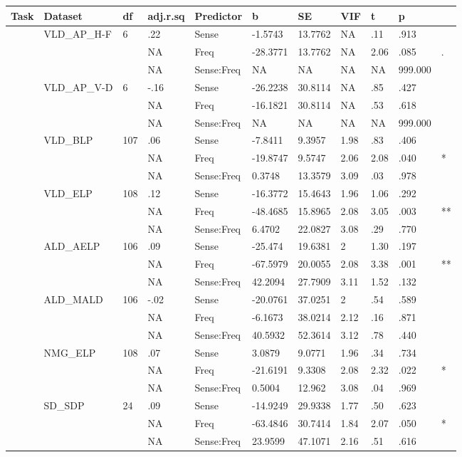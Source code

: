 \begin{table}[ht]
\centering
\begingroup\normalsize
\begin{tabular}{lllllllllll}
  \hline
Task & Dataset & df & adj.r.sq & Predictor & b & SE & VIF & t & p &  \\ 
  \hline
 & VLD\_AP\_H-F & 6 & .22 & Sense & -1.5743 & 13.7762 & NA & .11 & .913 &   \\ 
   &  &  & NA & Freq & -28.3771 & 13.7762 & NA & 2.06 & .085 & . \\ 
   &  &  & NA & Sense:Freq & NA & NA & NA & NA & 999.000 &  \\ 
   & VLD\_AP\_V-D & 6 & -.16 & Sense & -26.2238 & 30.8114 & NA & .85 & .427 &   \\ 
   &  &  & NA & Freq & -16.1821 & 30.8114 & NA & .53 & .618 &   \\ 
   &  &  & NA & Sense:Freq & NA & NA & NA & NA & 999.000 &  \\ 
   & VLD\_BLP & 107 & .06 & Sense & -7.8411 & 9.3957 & 1.98 & .83 & .406 &   \\ 
   &  &  & NA & Freq & -19.8747 & 9.5747 & 2.06 & 2.08 & .040 & * \\ 
   &  &  & NA & Sense:Freq & 0.3748 & 13.3579 & 3.09 & .03 & .978 &   \\ 
   & VLD\_ELP & 108 & .12 & Sense & -16.3772 & 15.4643 & 1.96 & 1.06 & .292 &   \\ 
   &  &  & NA & Freq & -48.4685 & 15.8965 & 2.08 & 3.05 & .003 & ** \\ 
   &  &  & NA & Sense:Freq & 6.4702 & 22.0827 & 3.08 & .29 & .770 &   \\ 
   & ALD\_AELP & 106 & .09 & Sense & -25.474 & 19.6381 & 2 & 1.30 & .197 &   \\ 
   &  &  & NA & Freq & -67.5979 & 20.0055 & 2.08 & 3.38 & .001 & ** \\ 
   &  &  & NA & Sense:Freq & 42.2094 & 27.7909 & 3.11 & 1.52 & .132 &   \\ 
   & ALD\_MALD & 106 & -.02 & Sense & -20.0761 & 37.0251 & 2 & .54 & .589 &   \\ 
   &  &  & NA & Freq & -6.1673 & 38.0214 & 2.12 & .16 & .871 &   \\ 
   &  &  & NA & Sense:Freq & 40.5932 & 52.3614 & 3.12 & .78 & .440 &   \\ 
   & NMG\_ELP & 108 & .07 & Sense & 3.0879 & 9.0771 & 1.96 & .34 & .734 &   \\ 
   &  &  & NA & Freq & -21.6191 & 9.3308 & 2.08 & 2.32 & .022 & * \\ 
   &  &  & NA & Sense:Freq & 0.5004 & 12.962 & 3.08 & .04 & .969 &   \\ 
   & SD\_SDP & 24 & .09 & Sense & -14.9249 & 29.9338 & 1.77 & .50 & .623 &   \\ 
   &  &  & NA & Freq & -63.4846 & 30.7414 & 1.84 & 2.07 & .050 & * \\ 
   &  &  & NA & Sense:Freq & 23.9599 & 47.1071 & 2.16 & .51 & .616 &   \\ 
   \hline
\end{tabular}
\endgroup
\end{table}
